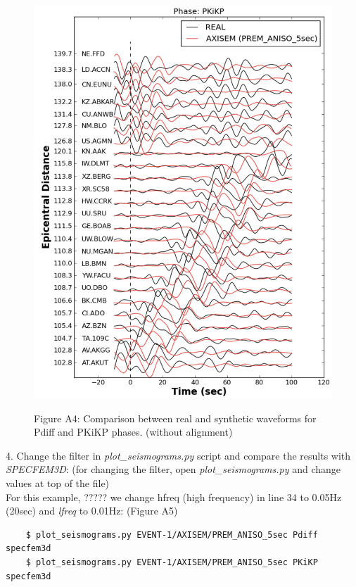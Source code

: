 \documentclass{article}
\begin{document}
\begin{figure}
\begin{minipage}{.5\textwidth}
  \includegraphics[width=1.\linewidth]{AXISEMTutorial-fig009.pdf}
\end{minipage}
\begin{center}
{\small{}Figure A4: Comparison between real and synthetic waveforms for Pdiff and 
PKiKP phases. (without alignment)}
\end{center}
\end{figure}


4. Change the filter in \textit{plot\_seismograms.py} script and compare the results with 
\textit{SPECFEM3D}: (for changing the filter, open \textit{plot\_seismograms.py} and change 
values at top of the file) \\
For this example, ????? we change hfreq (high frequency) in line 34 to 0.05Hz (20sec) and \textit{lfreq }to 0.01Hz: (Figure 
A5)

\begin{verbatim}
    $ plot_seismograms.py EVENT-1/AXISEM/PREM_ANISO_5sec Pdiff specfem3d
    $ plot_seismograms.py EVENT-1/AXISEM/PREM_ANISO_5sec PKiKP specfem3d
\end{verbatim}
\end{document}
